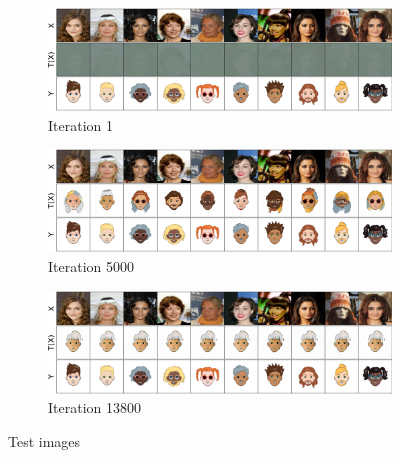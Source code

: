 \documentclass[11pt]{article}
\begin{document}
\begin{figure}[htp!]
    \centering
    \begin{subfigure}{\textwidth}
        \centering
        \includegraphics[scale=.15]{figures/media_images_Fixed Images_0_a56284c48d003ecfb6cd.png}
        \caption{Iteration 1}
        \label{fig:test_images_real_iter_1}
    \end{subfigure}%

    \bigskip

    \begin{subfigure}{\textwidth}
        \centering
        \includegraphics[scale=.15]{figures/media_images_Fixed Images_5000_0043c7527d827202e7ad.png}
        \caption{Iteration 5000}
        \label{fig:test_images_real_iter_med}
    \end{subfigure}%

    \bigskip

    \begin{subfigure}{\textwidth}
        \centering
        \includegraphics[scale=.15]{figures/media_images_Fixed Images_13800_653d5de40c4ba6a777ca.png}
        \caption{Iteration 13800}
        \label{fig:test_images_real_iter_last}
    \end{subfigure}%
    \caption{Test images}
    \label{fig:test_samples_large_scale}
\end{figure}
\end{document}
